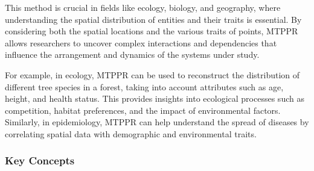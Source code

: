 \documentclass[
  letterpaper,
  DIV=11,
  numbers=noendperiod]{scrreprt}
\begin{document}
This method is crucial in fields like ecology, biology, and geography,
where understanding the spatial distribution of entities and their
traits is essential. By considering both the spatial locations and the
various traits of points, MTPPR allows researchers to uncover complex
interactions and dependencies that influence the arrangement and
dynamics of the systems under study.

For example, in ecology, MTPPR can be used to reconstruct the
distribution of different tree species in a forest, taking into account
attributes such as age, height, and health status. This provides
insights into ecological processes such as competition, habitat
preferences, and the impact of environmental factors. Similarly, in
epidemiology, MTPPR can help understand the spread of diseases by
correlating spatial data with demographic and environmental traits.

\subsubsection*{Key Concepts}\label{key-concepts}
\end{document}
